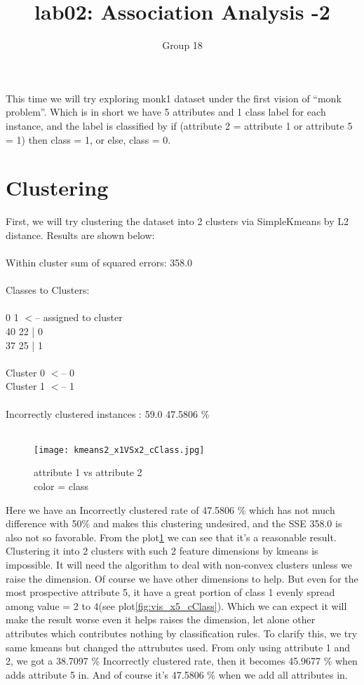 \documentclass{article}
\title{lab02: Association Analysis -2}
\author{Group 18}
\begin{document}
\maketitle

This time we will try exploring monk1 dataset under the first vision of “monk problem”. Which is in short we have 5 attributes and 1 class label for each instance, and the label is classified by if (attribute 2 = attribute 1 or attribute 5 = 1) then class = 1, or else, class = 0.
\section{Clustering}

First, we will try clustering the dataset into 2 clusters via SimpleKmeans by L2 distance. Results are shown below:\\
\\
Within cluster sum of squared errors: 358.0 \\
\\
Classes to Clusters:\\
\\
  0  1  $<$-- assigned to cluster\\
 40 22 | 0\\
 37 25 | 1\\
\\
Cluster 0 $<$-- 0\\
Cluster 1 $<$-- 1\\
\\
Incorrectly clustered instances :	59.0	 47.5806 \% \\
\\

\begin{figure}[H]
\centering
\texttt{[image: kmeans2\_x1VSx2\_cClass.jpg]}
\caption{\label{fig:kmeans2_x1VSx2_cClass}attribute 1 vs attribute 2 \\ color = class}
\end{figure}

Here we have an Incorrectly clustered rate of 47.5806 \% which has not much difference with 50\% and makes this clustering undesired, and the SSE 358.0 is also not so favorable. From the plot\ref{fig:kmeans2_x1VSx2_cClass} we can see that it’s a reasonable result. Clustering it into 2 clusters with such 2 feature dimensions by kmeans is impossible. It will need the algorithm to deal with non-convex clusters unless we raise the dimension.  Of course we have other dimensions to help. But even for the most prospective attribute 5, it have a great portion of class 1 evenly spread among value = 2 to 4(see plot\ref{fig:vis_x5_cClass}). Which we can expect it will make the result worse even it helps raises the dimension, let alone other attributes which contributes nothing by classification rules. To clarify this, we try same kmeans but changed the attrubutes used. From only using attribute 1 and 2, we got a 38.7097 \% Incorrectly clustered rate, then it becomes 45.9677 \% when adds attribute 5 in. And of course it’s 47.5806 \% when we add all attributes in.
\end{document}

